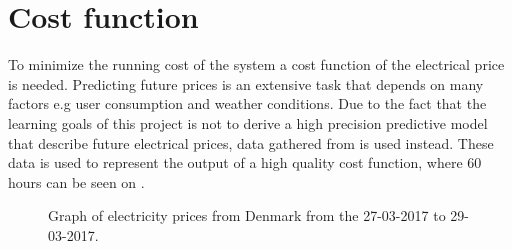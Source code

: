 \section{Cost function}

To minimize the running cost of the system a cost function of the electrical price is needed. Predicting future prices is an extensive task that depends on many factors e.g user consumption and weather conditions. Due to the fact that the learning goals of this project is not to derive a high precision predictive model that describe future electrical prices, data gathered from \cite{Electrical_price} is used instead. These data is used to represent the output of a high quality cost function, where 60 hours can be seen on . 





	


\begin{figure}[H]
\centering

\caption{Graph of electricity prices from Denmark from the 27-03-2017 to 29-03-2017.}
\label{fig:electrical_price} 
\end{figure}



